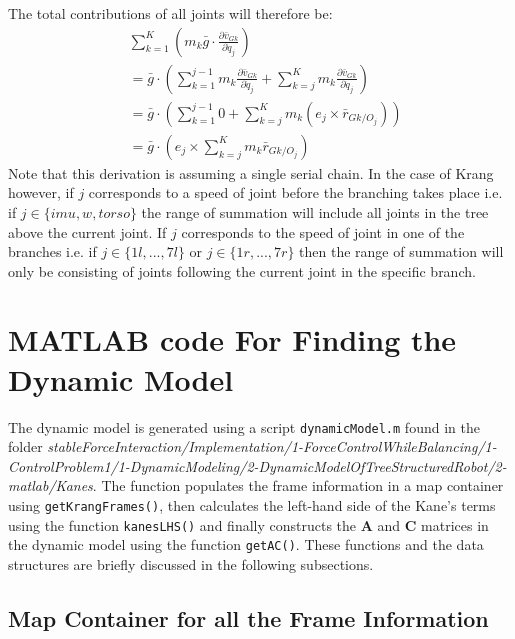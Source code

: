 \documentclass[a4paper,10pt]{article}
\begin{document}
The total contributions of all joints will therefore be:
\begin{align}
 &\sum\limits_{k=1}^K \left( m_k\bar{g} \cdot \frac{\partial \bar{v}_{Gk}}{\partial \dot{q}_j} \right) \nonumber \\
 &= \bar{g} \cdot \left( \sum\limits_{k=1}^{j-1} m_k\frac{\partial \bar{v}_{Gk}}{\partial \dot{q}_j} + \sum\limits_{k=j}^{K} m_k\frac{\partial \bar{v}_{Gk}}{\partial \dot{q}_j} \right) \nonumber \\ 
 &= \bar{g} \cdot \left( \sum\limits_{k=1}^{j-1} 0 + \sum\limits_{k=j}^{K} m_k\left({e}_j \times \bar{r}_{Gk/O_j} \right) \right) \nonumber \\
 &= \bar{g} \cdot \left( {e}_j \times \sum\limits_{k=j}^{K} m_k\bar{r}_{Gk/O_j} \right) \label{gravity2}
\end{align}
Note that this derivation is assuming a single serial chain. In the case of Krang however, if $j$ corresponds to a 
speed of joint before the branching takes place i.e. if $j \in \{ imu, w, torso \}$ the range of summation will include
all joints in the tree above the current joint. If $j$ corresponds to the speed of joint in one of the branches
i.e. if $j \in \{ 1l, ... , 7l \}$ or $j \in \{ 1r, ... , 7r \}$ then the range of summation will only be consisting
of joints following the current joint in the specific branch.

\section{MATLAB code For Finding the Dynamic Model}

The dynamic model is generated using a script \texttt{dynamicModel.m} found in the folder 
\textit{ stableForceInteraction/Implementation/1-ForceControlWhileBalancing/1-ControlProblem1/1-DynamicModeling/2-DynamicModelOfTreeStructuredRobot/2-matlab/Kanes}.
The function populates the frame information in a map container using \texttt{getKrangFrames()}, then 
calculates the left-hand side of the Kane's terms using the function \texttt{kanesLHS()} and finally
constructs the $\mathbf{A}$ and $\mathbf{C}$ matrices in the dynamic model using the function 
\texttt{getAC()}. These functions and the data structures are briefly discussed in the following
subsections.

\subsection{Map Container for all the Frame Information}
\end{document}
